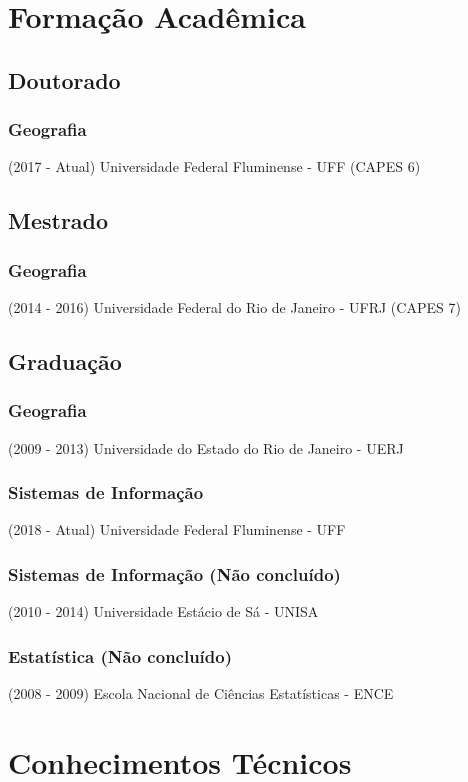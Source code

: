 \documentclass{article}
\begin{document}
\section{Formação Acadêmica}
\subsection{Doutorado}
\subsubsection{Geografia}
(2017 - Atual) Universidade Federal Fluminense - UFF (CAPES 6) 
\subsection{Mestrado}
\subsubsection{Geografia}
(2014 - 2016) Universidade Federal do Rio de Janeiro - UFRJ (CAPES 7)
\subsection{Graduação}
\subsubsection{Geografia}
(2009 - 2013) Universidade do Estado do Rio de Janeiro - UERJ
\subsubsection{Sistemas de Informação}
(2018 - Atual) Universidade Federal Fluminense - UFF
\subsubsection{Sistemas de Informação (Não concluído)}
(2010 - 2014) Universidade Estácio de Sá - UNISA
\subsubsection{Estatística (Não concluído)}
(2008 - 2009) Escola Nacional de Ciências Estatísticas - ENCE


\section{Conhecimentos Técnicos}
\end{document}
